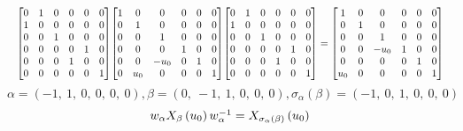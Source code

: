 \documentclass[11pt]{article}
\theoremstyle{definition}
\begin{document}
\[
\scaletoalign{\textwidth}{{\left[\begin{matrix}0 & 1 & 0 & 0 & 0 & 0\\1 & 0 & 0 & 0 & 0 & 0\\0 & 0 & 1 & 0 & 0 & 0\\0 & 0 & 0 & 0 & 1 & 0\\0 & 0 & 0 & 1 & 0 & 0\\0 & 0 & 0 & 0 & 0 & 1\end{matrix}\right]} {\left[\begin{matrix}1 & 0 & 0 & 0 & 0 & 0\\0 & 1 & 0 & 0 & 0 & 0\\0 & 0 & 1 & 0 & 0 & 0\\0 & 0 & 0 & 1 & 0 & 0\\0 & 0 & - u_{0} & 0 & 1 & 0\\0 & u_{0} & 0 & 0 & 0 & 1\end{matrix}\right]} {\left[\begin{matrix}0 & 1 & 0 & 0 & 0 & 0\\1 & 0 & 0 & 0 & 0 & 0\\0 & 0 & 1 & 0 & 0 & 0\\0 & 0 & 0 & 0 & 1 & 0\\0 & 0 & 0 & 1 & 0 & 0\\0 & 0 & 0 & 0 & 0 & 1\end{matrix}\right]} = {\left[\begin{matrix}1 & 0 & 0 & 0 & 0 & 0\\0 & 1 & 0 & 0 & 0 & 0\\0 & 0 & 1 & 0 & 0 & 0\\0 & 0 & - u_{0} & 1 & 0 & 0\\0 & 0 & 0 & 0 & 1 & 0\\u_{0} & 0 & 0 & 0 & 0 & 1\end{matrix}\right]}}
\]
\[
\alpha = \left( -1, \  1, \  0, \  0, \  0, \  0\right), \beta = \left( 0, \  -1, \  1, \  0, \  0, \  0\right), \sigma_{\alpha}(\beta) = \left( -1, \  0, \  1, \  0, \  0, \  0\right)
\]
\[
\scaletoalign{\textwidth}{w_{\alpha} X_{\beta}\left(u_{0}\right) w_{\alpha}^{-1} = X_{\sigma_{\alpha}\left(\beta\right)}\left(u_{0}\right)}
\]
\end{document}
